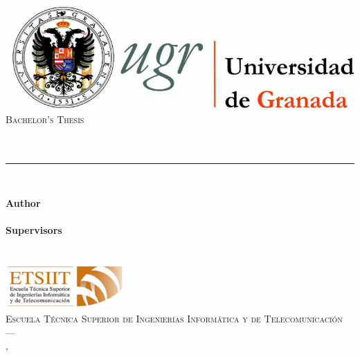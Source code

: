 



\begin{titlepage}
 
    \newlength{\centeroffset}
    \setlength{\centeroffset}{-0.5\oddsidemargin}
    \addtolength{\centeroffset}{0.5\evensidemargin}
    \thispagestyle{empty}

    \noindent\hspace*{\centeroffset}\begin{minipage}{\textwidth}

    \centering
    \includegraphics[width=\textwidth]{gfx/logo_ugr.jpg}\\[2.4cm]

    \textsc{ \Large Bachelor's Thesis\\[0.2cm]}
    \textsc{ \myDegree}\\[1cm]
    \begingroup
        \color{Maroon}{\Huge\myTitle} \\
    \endgroup
    \noindent\rule[-1ex]{\textwidth}{3pt}\\[3.5ex]
    {\large\bfseries \mySubtitle}
    \end{minipage}

    \vspace{2.5cm}
    \noindent\hspace*{\centeroffset}\begin{minipage}{\textwidth}
    \centering

    \textbf{Author}\\ {\spacedlowsmallcaps{\myName}}\\[2.5ex]
    \textbf{Supervisors}\\
    {\spacedlowsmallcaps{\myProf}\\
    \spacedlowsmallcaps{\myOtherProf}}\\[2.5cm]
    \includegraphics[width=0.35\textwidth]{gfx/etsiit_logo.png}\\[0.1cm]
    \textsc{Escuela Técnica Superior de Ingenierías Informática y de Telecomunicación}\\
    \textsc{---}\\
    \myLocation, \myTime
    \end{minipage}

\end{titlepage}